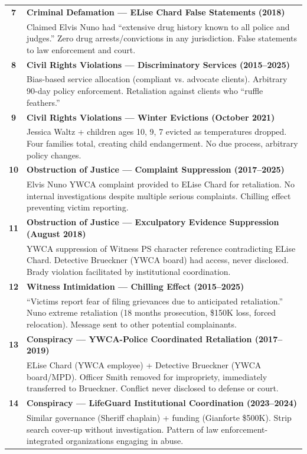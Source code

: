 \documentclass[11pt,letterpaper]{article}
\begin{document}
\begin{longtable}{cp{5in}}
\textbf{7} & \textbf{Criminal Defamation --- ELise Chard False Statements (2018)}\\
& Claimed Elvis Nuno had ``extensive drug history known to all police and judges.'' Zero drug arrests/convictions in any jurisdiction. False statements to law enforcement and court.\\
\midrule

\textbf{8} & \textbf{Civil Rights Violations --- Discriminatory Services (2015--2025)}\\
& Bias-based service allocation (compliant vs. advocate clients). Arbitrary 90-day policy enforcement. Retaliation against clients who ``ruffle feathers.''\\
\midrule

\textbf{9} & \textbf{Civil Rights Violations --- Winter Evictions (October 2021)}\\
& Jessica Waltz + children ages 10, 9, 7 evicted as temperatures dropped. Four families total, creating child endangerment. No due process, arbitrary policy changes.\\
\midrule

\textbf{10} & \textbf{Obstruction of Justice --- Complaint Suppression (2017--2025)}\\
& Elvis Nuno YWCA complaint provided to ELise Chard for retaliation. No internal investigations despite multiple serious complaints. Chilling effect preventing victim reporting.\\
\midrule

\textbf{11} & \textbf{Obstruction of Justice --- Exculpatory Evidence Suppression (August 2018)}\\
& YWCA suppression of Witness PS character reference contradicting ELise Chard. Detective Brueckner (YWCA board) had access, never disclosed. Brady violation facilitated by institutional coordination.\\
\midrule

\textbf{12} & \textbf{Witness Intimidation --- Chilling Effect (2015--2025)}\\
& ``Victims report fear of filing grievances due to anticipated retaliation.'' Nuno extreme retaliation (18 months prosecution, \$150K loss, forced relocation). Message sent to other potential complainants.\\
\midrule

\textbf{13} & \textbf{Conspiracy --- YWCA-Police Coordinated Retaliation (2017--2019)}\\
& ELise Chard (YWCA employee) + Detective Brueckner (YWCA board/MPD). Officer Smith removed for impropriety, immediately transferred to Brueckner. Conflict never disclosed to defense or court.\\
\midrule

\textbf{14} & \textbf{Conspiracy --- LifeGuard Institutional Coordination (2023--2024)}\\
& Similar governance (Sheriff chaplain) + funding (Gianforte \$500K). Strip search cover-up without investigation. Pattern of law enforcement-integrated organizations engaging in abuse.\\
\bottomrule
\end{longtable}
\end{document}
